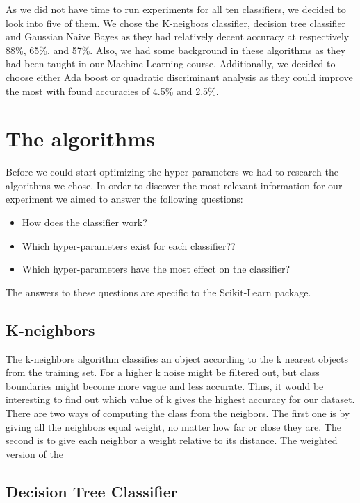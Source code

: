 \documentclass{article}
\begin{document}
	As we did not have time to run experiments for all ten classifiers, we decided to look into five of them. We chose the K-neigbors classifier, decision tree classifier and Gaussian Naive Bayes as they had relatively decent accuracy at respectively 88\%, 65\%, and 57\%. Also, we had some background in these algorithms as they had been taught in our Machine Learning course. Additionally, we decided to choose either Ada boost or quadratic discriminant analysis as they could improve the most with found accuracies of 4.5\% and 2.5\%. 

\newpage
\section{The algorithms}
	Before we could start optimizing the hyper-parameters we had to research the algorithms we chose. In order to discover the most relevant information for our experiment we aimed to answer the following questions:
	
	\begin{itemize}
		\item How does the classifier work? 
		\item Which hyper-parameters exist for each classifier??
		\item Which hyper-parameters have the most effect on the classifier?
	\end{itemize}
	
	The answers to these questions are specific to the Scikit-Learn package.
	
	\subsection{K-neighbors}
		The k-neighbors algorithm classifies an object according to the k nearest objects from the training set. For a higher k noise might be filtered out, but class boundaries might become more vague and less accurate. Thus, it would be interesting to find out which value of k gives the highest accuracy for our dataset. There are two ways of computing the class from the neigbors. The first one is by giving all the neighbors equal weight, no matter how far or close they are.  The second is to give each neighbor a weight relative to its distance. The weighted version of the 
	
	\subsection{Decision Tree Classifier}
	
\end{document}
